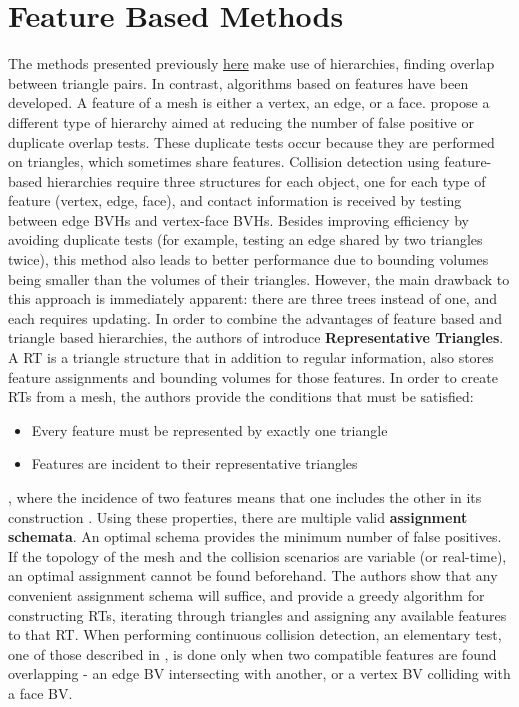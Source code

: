 \FloatBarrier
\section{Feature Based Methods}
\label{sec:feature}

The methods presented previously \hyperref[sec:bvh]{here} make use of hierarchies, finding overlap between triangle pairs. In contrast, algorithms based on features have been developed. A feature of a mesh is either a vertex, an edge, or a face. \citep{curtis2008} propose a different type of hierarchy aimed at reducing the number of false positive or duplicate overlap tests. These duplicate tests occur because they are performed on triangles, which sometimes share features. Collision detection using feature-based hierarchies require three structures for each object, one for each type of feature (vertex, edge, face), and contact information is received by testing between edge BVHs and vertex-face BVHs. Besides improving efficiency by avoiding duplicate tests (for example, testing an edge shared by two triangles twice), this method also leads to better performance due to bounding volumes being smaller than the volumes of their triangles. However, the main drawback to this approach is immediately apparent: there are three trees instead of one, and each requires updating. In order to combine the advantages of feature based and triangle based hierarchies, the authors of \citep{curtis2008} introduce \textbf{Representative Triangles}. A RT is a triangle structure that in addition to regular information, also stores feature assignments and bounding volumes for those features. In order to create RTs from a mesh, the authors provide the conditions that must be satisfied:

\begin{itemize}
	\item Every feature must be represented by exactly one triangle
	\item Features are incident to their representative triangles
\end{itemize}

, where the incidence of two features means that one includes the other in its construction \citep{curtis2008}. Using these properties, there are multiple valid \textbf{assignment schemata}. An optimal schema provides the minimum number of false positives. If the topology of the mesh and the collision scenarios are variable (or real-time), an optimal assignment cannot be found beforehand. The authors show that any convenient assignment schema will suffice, and provide a greedy algorithm for constructing RTs, iterating through triangles and assigning any available features to that RT. When performing continuous collision detection, an elementary test, one of those described in \citep{provot97}, is done only when two compatible features are found overlapping - an edge BV intersecting with another, or a vertex BV colliding with a face BV.


